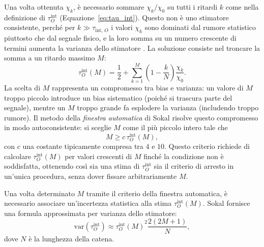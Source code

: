 Una volta ottenuta $\chi_k$, è necessario sommare $\chi_k/\chi_0$ su tutti i ritardi $k$ come nella definizione di $\tau^{\mathrm{int}}_O$ (Equazione~\ref{eq:tau_int}). Questo non è uno stimatore consistente, perché per $k \gg \tau_{\mathrm{int},\, O}$ i valori $\chi_k$ sono dominati dal rumore statistico piuttosto che dal segnale fisico, e la loro somma su un numero crescente di termini aumenta la varianza dello stimatore \cite{sokal1996monte}. La soluzione consiste nel troncare la somma a un ritardo massimo $M$:
\begin{equation}
    \tau^{\mathrm{int}}_O(M) = \frac{1}{2} + \sum_{k=1}^{M}\left(1-\frac{k}{N}\right)\frac{\chi_k}{\chi_0}.
\end{equation}
La scelta di $M$ rappresenta un compromesso tra bias e varianza: un valore di $M$ troppo piccolo introduce un bias sistematico (poiché si trascura parte del segnale), mentre un $M$ troppo grande fa esplodere la varianza (includendo troppo rumore). Il metodo della \emph{finestra automatica} di Sokal risolve questo compromesso in modo autoconsistente: si sceglie $M$ come il più piccolo intero tale che
\begin{equation}
    M \ge c\, \tau^{\mathrm{int}}_O(M),
\end{equation}
con $c$ una costante tipicamente compresa tra $4$ e $10$. Questo criterio richiede di calcolare $\tau^{\mathrm{int}}_O(M)$ per valori crescenti di $M$ finché la condizione non è soddisfatta, ottenendo così sia una stima di $\tau^{\mathrm{int}}_O$ sia il criterio di arresto in un'unica procedura, senza dover fissare arbitrariamente $M$.

Una volta determinato $M$ tramite il criterio della finestra automatica, è necessario associare un'incertezza statistica alla stima $\tau^{\mathrm{int}}_O(M)$. Sokal fornisce una formula approssimata per varianza dello stimatore:
\begin{equation}
    \text{var}(\tau^{\mathrm{int}}_O) \approx {\tau^{\mathrm{int}}_O(M)}^2 {\frac{2(2M+1)}{N}},
\end{equation}
dove $N$ è la lunghezza della catena.

\blankpage

\blankpage